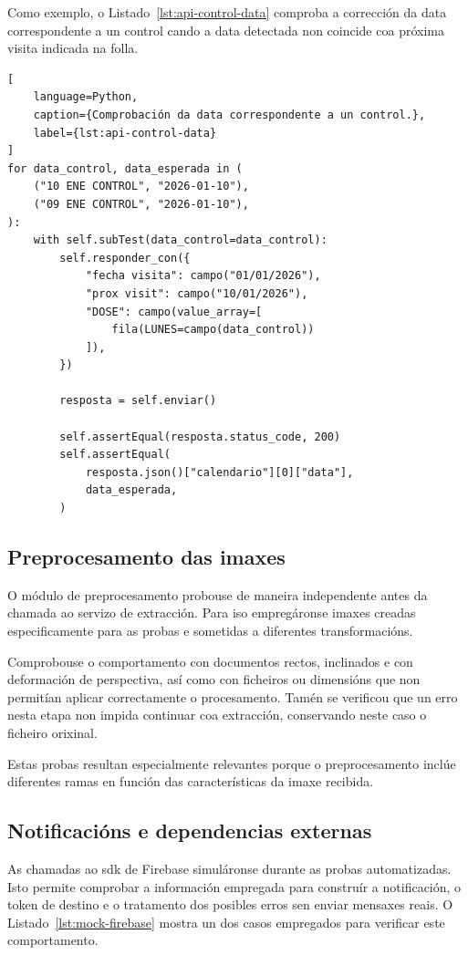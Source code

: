 Como exemplo, o Listado~\ref{lst:api-control-data} comproba a corrección da data correspondente a un control cando a data detectada non coincide coa próxima visita indicada na folla.

\begin{lstlisting}[
    language=Python,
    caption={Comprobación da data correspondente a un control.},
    label={lst:api-control-data}
]
for data_control, data_esperada in (
    ("10 ENE CONTROL", "2026-01-10"),
    ("09 ENE CONTROL", "2026-01-10"),
):
    with self.subTest(data_control=data_control):
        self.responder_con({
            "fecha visita": campo("01/01/2026"),
            "prox visit": campo("10/01/2026"),
            "DOSE": campo(value_array=[
                fila(LUNES=campo(data_control))
            ]),
        })

        resposta = self.enviar()

        self.assertEqual(resposta.status_code, 200)
        self.assertEqual(
            resposta.json()["calendario"][0]["data"],
            data_esperada,
        )
\end{lstlisting}


\subsection{Preprocesamento das imaxes}

O módulo de preprocesamento probouse de maneira independente antes da chamada ao servizo de extracción. Para iso empregáronse imaxes creadas especificamente para as probas e sometidas a diferentes transformacións.

Comprobouse o comportamento con documentos rectos, inclinados e con deformación de perspectiva, así como con ficheiros ou dimensións que non permitían aplicar correctamente o procesamento. Tamén se verificou que un erro nesta etapa non impida continuar coa extracción, conservando neste caso o ficheiro orixinal.

Estas probas resultan especialmente relevantes porque o preprocesamento inclúe diferentes ramas en función das características da imaxe recibida.


\subsection{Notificacións e dependencias externas}

As chamadas ao \gls{sdk} de Firebase simuláronse durante as probas automatizadas. Isto permite comprobar a información empregada para construír a notificación, o token de destino e o tratamento dos posibles erros sen enviar mensaxes reais. O Listado~\ref{lst:mock-firebase} mostra un dos casos empregados para verificar este comportamento.

